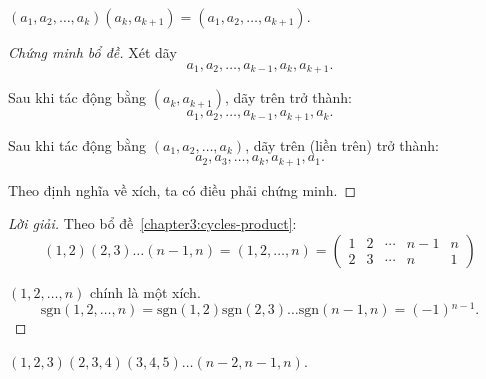 \documentclass[class=linearalgebra,crop=false]{standalone}
\newcommand{\sgn}[1]{\text{sgn}\left({#1}\right)}
\begin{document}
\begin{lemma}\label{chapter3:cycles-product}
    $(a_{1}, a_{2}, \ldots, a_{k})(a_{k},a_{k+1}) = (a_{1},a_{2},\ldots, a_{k+1})$.
\end{lemma}

\begin{proof}[Chứng minh bổ đề]
    \par Xét dãy
    \[
        a_{1}, a_{2}, \ldots, a_{k-1}, a_{k}, a_{k+1}.
    \]
    \par Sau khi tác động bằng $(a_{k},a_{k+1})$, dãy trên trở thành:
    \[
        a_{1}, a_{2}, \ldots, a_{k-1}, a_{k+1}, a_{k}.
    \]
    \par Sau khi tác động bằng $(a_{1}, a_{2}, \ldots, a_{k})$, dãy trên (liền trên) trở thành:
    \[
        a_{2}, a_{3}, \ldots, a_{k}, a_{k+1}, a_{1}.
    \]
    \par Theo định nghĩa về xích, ta có điều phải chứng minh.
\end{proof}

\begin{proof}[Lời giải]
    \par Theo bổ đề~\ref{chapter3:cycles-product}:
    \[
        (1,2)(2,3)\ldots (n-1,n) = (1,2,\ldots,n)
        =
        \begin{pmatrix}
            1 & 2 & \cdots & n-1 & n \\
            2 & 3 & \cdots & n   & 1
        \end{pmatrix}
    \]
    \par $(1,2,\ldots, n)$ chính là một xích.
    \[
        \sgn{1,2,\ldots,n} = \sgn{1,2}\sgn{2,3}\ldots\sgn{n-1,n} = (-1){}^{n-1}.
    \]
\end{proof}

\begin{exercise}
    $(1,2,3)(2,3,4)(3,4,5)\ldots (n-2,n-1,n)$.
\end{exercise}
\end{document}
